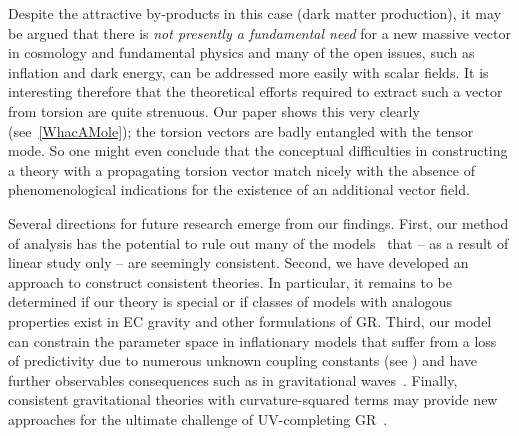\documentclass[aps,prd,reprint,preprintnumbers,showpacs,floatfix,nofootinbib,superscript address,longbibliography]{revtex4-1}
\begin{document}
Despite the attractive by-products in this case (\eg dark matter production), it may be argued that there is \emph{not presently a fundamental need} for a new massive vector in cosmology and fundamental physics and many of the open issues, such as inflation and dark energy, can be addressed more easily with scalar fields. It is interesting therefore that the theoretical efforts required to extract such a vector from torsion are quite strenuous. Our paper shows this very clearly (see~\cref{WhacAMole}); the torsion vectors are badly entangled with the tensor mode. So one might even conclude that the conceptual difficulties in constructing a theory with a propagating torsion vector match nicely with the absence of phenomenological indications for the existence of an additional vector field.

Several directions for future research emerge from our findings. First, our method of analysis has the potential to rule out many of the models~\cite{Sezgin:1981xs,Blagojevic:1983zz,Blagojevic:1986dm,Kuhfuss:1986rb,Yo:1999ex,Yo:2001sy,Blagojevic:2002,Puetzfeld:2004yg,Yo:2006qs,Nair:2008yh,Shie:2008ms,Chen:2009at,Nikiforova:2009qr,Ni:2009fg,Baekler:2010fr,Ho:2011qn,Ho:2011xf,Ong:2013qja,Puetzfeld:2014sja,Karananas:2014pxa,Karananas:2014pxa,Ho:2015ulu,Ni:2015poa,Karananas:2016ltn,Obukhov:2017pxa,Blagojevic:2017ssv,Blagojevic:2018dpz,Lin:2018awc,Blagojevic:2018dpz,Tseng:2018feo,Blagojevic:2018dpz,Zhang:2019xek,Zhang:2019mhd,Jimenez:2019qjc,Lin:2019ugq,BeltranJimenez:2019acz,Aoki:2019rvi,Percacci:2019hxn,BeltranJimenez:2020sqf,Barker:2020gcp,MaldonadoTorralba:2020mbh,Marzo:2021esg,delaCruzDombriz:2021nrg,Marzo:2021iok,Baldazzi:2021kaf,Barker:2021oez,Annala:2022gtl} that -- as a result of linear study only -- are seemingly consistent. Second, we have developed an approach to construct consistent theories. In particular, it remains to be determined if our theory is special or if classes of models with analogous properties exist in EC gravity and other formulations of GR. Third, our model can constrain the parameter space in inflationary models that suffer from a loss of predictivity due to numerous unknown coupling constants (see \eg \cite{Bauer:2008zj,Rodriguez:2017wkg,Rasanen:2018ihz, Raatikainen:2019qey, Langvik:2020nrs, Shaposhnikov:2020gts,Rigouzzo:2022yan}) and have further observables consequences such as in gravitational waves~\cite{Battista:2021rlh}. Finally, consistent gravitational theories with curvature-squared terms may provide new approaches for the ultimate challenge of UV-completing GR~\cite{Lin:2019ugq,Melichev:2023lwj}.
\end{document}
